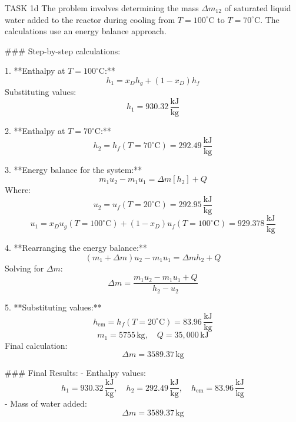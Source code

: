 TASK 1d  
The problem involves determining the mass \( \Delta m_{12} \) of saturated liquid water added to the reactor during cooling from \( T = 100^\circ\text{C} \) to \( T = 70^\circ\text{C} \). The calculations use an energy balance approach.

### Step-by-step calculations:

1. **Enthalpy at \( T = 100^\circ\text{C} \):**  
   \[
   h_1 = x_D h_g + (1 - x_D) h_f
   \]  
   Substituting values:  
   \[
   h_1 = 930.32 \, \frac{\text{kJ}}{\text{kg}}
   \]

2. **Enthalpy at \( T = 70^\circ\text{C} \):**  
   \[
   h_2 = h_f(T = 70^\circ\text{C}) = 292.49 \, \frac{\text{kJ}}{\text{kg}}
   \]

3. **Energy balance for the system:**  
   \[
   m_1 u_2 - m_1 u_1 = \Delta m \left[ h_2 \right] + Q
   \]  
   Where:  
   \[
   u_2 = u_f(T = 20^\circ\text{C}) = 292.95 \, \frac{\text{kJ}}{\text{kg}}
   \]  
   \[
   u_1 = x_D u_g(T = 100^\circ\text{C}) + (1 - x_D) u_f(T = 100^\circ\text{C}) = 929.378 \, \frac{\text{kJ}}{\text{kg}}
   \]

4. **Rearranging the energy balance:**  
   \[
   (m_1 + \Delta m) u_2 - m_1 u_1 = \Delta m h_2 + Q
   \]  
   Solving for \( \Delta m \):  
   \[
   \Delta m = \frac{m_1 u_2 - m_1 u_1 + Q}{h_2 - u_2}
   \]

5. **Substituting values:**  
   \[
   h_{\text{em}} = h_f(T = 20^\circ\text{C}) = 83.96 \, \frac{\text{kJ}}{\text{kg}}
   \]  
   \[
   m_1 = 5755 \, \text{kg}, \quad Q = 35,000 \, \text{kJ}
   \]  
   Final calculation:  
   \[
   \Delta m = 3589.37 \, \text{kg}
   \]

### Final Results:  
- Enthalpy values:  
  \[
  h_1 = 930.32 \, \frac{\text{kJ}}{\text{kg}}, \quad h_2 = 292.49 \, \frac{\text{kJ}}{\text{kg}}, \quad h_{\text{em}} = 83.96 \, \frac{\text{kJ}}{\text{kg}}
  \]  
- Mass of water added:  
  \[
  \Delta m = 3589.37 \, \text{kg}
  \]